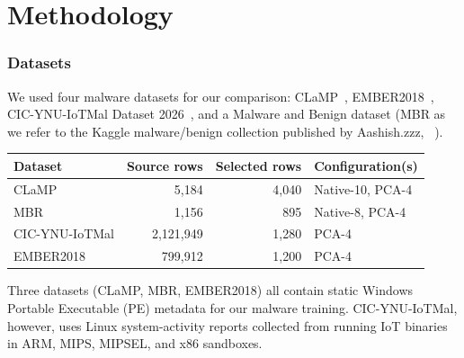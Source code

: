 \documentclass[letterpaper]{article} %
\begin{document}
\section{Methodology}



\subsubsection{Datasets}

We used four malware datasets for our comparison: CLaMP~\cite{clamp}, EMBER2018~\cite{ember2018}, CIC-YNU-IoTMal Dataset 2026~\cite{cic}, and a Malware and Benign dataset (MBR as we refer to the Kaggle malware/benign collection published by Aashish.zzz, ~\cite{synthetic}). 

\begin{center}
\label{tab:dataset-design}
\small
\begin{tabular}{lrrl}
\toprule
Dataset & Source rows & Selected rows & Configuration(s) \\
\midrule
CLaMP & 5,184 & 4,040 & Native-10, PCA-4 \\
MBR & 1,156 & 895 & Native-8, PCA-4 \\
CIC-YNU-IoTMal & 2,121,949 & 1,280 & PCA-4 \\
EMBER2018 & 799,912 & 1,200 & PCA-4 \\
\bottomrule
\end{tabular}
\end{center}

Three datasets (CLaMP, MBR, EMBER2018) all contain static Windows Portable Executable (PE) metadata for our malware training. CIC-YNU-IoTMal, however, uses Linux system-activity reports collected from running IoT binaries in ARM, MIPS, MIPSEL, and x86 sandboxes. 
\end{document}
